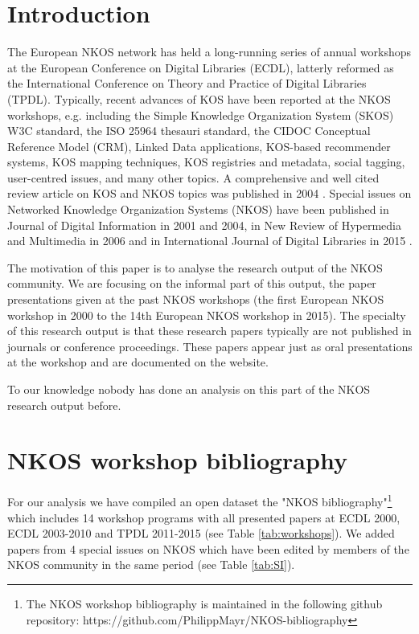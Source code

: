 \documentclass[runningheads,a4paper]{llncs}
\begin{document}
\section{Introduction}\label{intro}

The European NKOS network has held a long-running series of annual workshops at the European Conference on Digital Libraries (ECDL), latterly reformed as the International Conference on Theory and Practice of Digital Libraries (TPDL). 
Typically, recent advances of KOS have been reported at the NKOS workshops, e.g. including the Simple Knowledge Organization System (SKOS) W3C standard, the ISO 25964 thesauri standard, the CIDOC Conceptual Reference Model (CRM), Linked Data applications, KOS-based recommender systems, KOS mapping techniques, KOS registries and metadata, social tagging, user-centred issues, and many other topics. A comprehensive and well cited review article on KOS and NKOS topics was published in 2004 \cite{Zeng2004}. Special issues on Networked Knowledge Organization Systems (NKOS) have been published in Journal of Digital Information in 2001 and 2004, in New Review of Hypermedia and Multimedia in 2006 and in International Journal of Digital Libraries in 2015 \cite{Mayr2016}. 

The motivation of this paper is to analyse the research output of the NKOS community. We are focusing on the informal part of this output, the paper presentations given at the past NKOS workshops (the first European NKOS workshop in 2000 to the 14th European NKOS workshop in 2015). The specialty of this research output is that these research papers typically are not published in journals or conference proceedings. These papers appear just as oral presentations at the workshop and are documented on the website. 

To our knowledge nobody has done an analysis on this part of the NKOS research output before. 



\section{NKOS workshop bibliography}\label{dataset}

For our analysis we have compiled an open dataset the "NKOS bibliography"\footnote{The NKOS workshop bibliography is maintained in the following github repository: https://github.com/PhilippMayr/NKOS-bibliography} which includes 14 workshop programs with all presented papers at ECDL 2000, ECDL 2003-2010 and TPDL 2011-2015 (see Table \ref{tab:workshops}). We added papers from 4 special issues on NKOS which have been edited by members of the NKOS community in the same period (see Table \ref{tab:SI}). 
\end{document}

